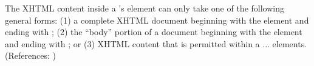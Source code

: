 The XHTML content inside a \Constraint's  element can only
take one of the following general forms: (1) a complete XHTML document
beginning with the element  and ending with ;
(2) the ``body'' portion of a document beginning with the element
 and ending with ; or (3) XHTML content that
is permitted within a  ...  elements.
(References: )
